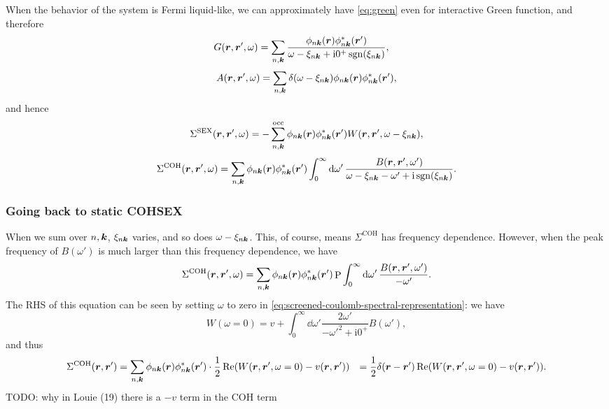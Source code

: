 \documentclass[hyperref, a4paper, 12pt]{report}
\DeclareMathOperator{\primevalue}{P}
\DeclareMathOperator{\sgn}{sgn}
\newcommand*{\ii}{\mathrm{i}}
\def\\{}%
\begin{document}
When the behavior of the system is Fermi liquid-like, 
we can approximately have \eqref{eq:green} even for interactive Green function,
and therefore 
\begin{equation}
    G(\vb*{r}, \vb*{r}', \omega)
    = \sum_{n, \vb*{k}} \frac{
        \phi_{n \vb*{k}}(\vb*{r}) \phi^*_{n \vb*{k}}(\vb*{r}')
    }{
        \omega - \xi_{n \vb*{k}} + \ii 0^+ \sgn(\xi_{n \vb*{k}})
    }, \quad 
\end{equation}
\begin{equation}
    A(\vb*{r}, \vb*{r}', \omega)
    = \sum_{n, \vb*{k}} \delta(\omega - \xi_{n \vb*{k}})
    \phi_{n \vb*{k}}(\vb*{r}) \phi^*_{n \vb*{k}}(\vb*{r}'),
\end{equation}
and hence 
\begin{equation}
    \Sigma^{\text{SEX}}(\vb*{r}, \vb*{r}', \omega)
    = - \sum_{n, \vb*{k}}^{\text{occ}}
    \phi_{n \vb*{k}}(\vb*{r}) \phi_{n \vb*{k}}^*(\vb*{r}') 
    W(\vb*{r}, \vb*{r}', \omega - \xi_{n \vb*{k}}), 
    \label{eq:sigma-sex-fermi-liquid}
\end{equation}
\begin{equation}
    \Sigma^{\text{COH}}(\vb*{r}, \vb*{r}', \omega)
    = \sum_{n, \vb*{k}} \phi_{n \vb*{k}}(\vb*{r}) \phi_{n \vb*{k}}^*(\vb*{r}')
    \int_{0}^{\infty} \dd{\omega'}
    \frac{B(\vb*{r}, \vb*{r}', \omega')}{\omega - \xi_{n \vb*{k}} - \omega' + \ii \sgn(\xi_{n \vb*{k}})}.
    \label{eq:sigma-coh-fermi-liquid}
\end{equation}

\subsubsection{Going back to static COHSEX}

When we sum over $n, \vb*{k}$,
$\xi_{n \vb*{k}}$ varies, 
and so does $\omega - \xi_{n \vb*{k}}$.
This, of course, means $\Sigma^{\text{COH}}$ has frequency dependence.
However, when the peak frequency of $B(\omega')$ 
is much larger than this frequency dependence,
we have 
\[
    \Sigma^{\text{COH}}(\vb*{r}, \vb*{r}', \omega)
    = \sum_{n, \vb*{k}} \phi_{n \vb*{k}}(\vb*{r}) \phi_{n \vb*{k}}^*(\vb*{r}')
    \primevalue \int_{0}^{\infty} \dd{\omega'}
    \frac{B(\vb*{r}, \vb*{r}', \omega')}{- \omega'}.
\]
The RHS of this equation can be seen by setting $\omega$ to zero in 
\eqref{eq:screened-coulomb-spectral-representation}:
we have 
\[
    W(\omega = 0) = v + \int_{0}^{\infty} \dd{\omega'} \frac{2 \omega'}{- \omega'^2 + \ii 0^+} B(\omega'),
\]
and thus 
\begin{equation}
    \begin{aligned}
        \Sigma^{\text{COH}}(\vb*{r}, \vb*{r}')
        &= \sum_{n, \vb*{k}} \phi_{n \vb*{k}}(\vb*{r}) \phi_{n \vb*{k}}^*(\vb*{r}') \cdot 
        \frac{1}{2} \Re (W(\vb*{r}, \vb*{r}', \omega = 0) - v(\vb*{r}, \vb*{r}')) \\
        &= \frac{1}{2} \delta(\vb*{r} - \vb*{r}') 
        \Re (W(\vb*{r}, \vb*{r}', \omega = 0) - v(\vb*{r}, \vb*{r}')) .
    \end{aligned}
\end{equation}
TODO: why in Louie (19) there is a $-v$ term in the COH term 
\end{document}
